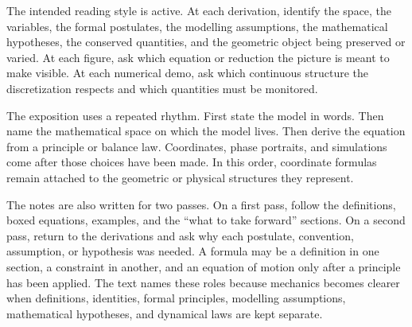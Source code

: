 \documentclass[11pt]{book}
\begin{document}
The intended reading style is active. At each derivation, identify the space,
the variables, the formal postulates, the modelling assumptions, the
mathematical hypotheses, the conserved quantities, and the geometric object
being preserved or varied. At each figure,
ask which equation or reduction the picture is meant to make visible. At each
numerical demo, ask which continuous structure the discretization respects and
which quantities must be monitored.

The exposition uses a repeated rhythm. First state the model in words. Then
name the mathematical space on which the model lives. Then derive the equation
from a principle or balance law. Coordinates, phase portraits, and simulations
come after those choices have been made. In this order, coordinate formulas
remain attached to the geometric or physical structures they represent.

The notes are also written for two passes. On a first pass, follow the
definitions, boxed equations, examples, and the ``what to take forward''
sections. On a second pass, return to the derivations and ask why each
postulate, convention, assumption, or hypothesis was needed. A formula may be a
definition in one section, a constraint in another, and an equation of motion
only after a principle has been applied. The text names these roles because
mechanics becomes clearer when definitions, identities, formal principles,
modelling assumptions, mathematical hypotheses, and dynamical laws are kept
separate.
\end{document}
